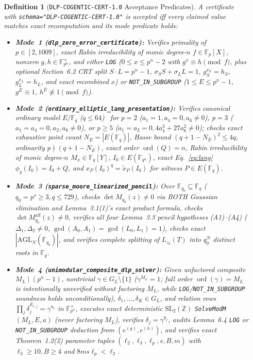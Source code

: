 \documentclass[10pt,twocolumn]{article}
\newtheorem{definition}{Definition}
\newcommand{\FF}{\mathbb{F}}
\newcommand{\ZZ}{\mathbb{Z}}
\begin{document}
\begin{definition}[\nolinkurl{DLP-COGENTIC-CERT-1.0} Acceptance Predicates]\label{def:cert}
\normalfont A certificate with \nolinkurl{schema="DLP-COGENTIC-CERT-1.0"} is accepted iff every claimed value matches exact recomputation and its mode predicate holds:
\begin{itemize}[leftmargin=1.2em,itemsep=1pt,topsep=2pt]
  \item \textbf{Mode~1 (\nolinkurl{dlp_zero_error_certificate}):} Verifies primality of $p\in[2,1009]$, exact Rabin irreducibility of monic degree-$n$ $f\in\FF_p[X]$, nonzero $g,h\in\FF_{p^n}^\times$, and either \texttt{LOG} ($0\le x\le p^n-2$ with $g^x\equiv h\pmod f$, plus optional Section~6.2 CRT split $S\cdot L=p^n-1$, $\sigma_S S+\sigma_L L=1$, $g_S^{x_S}=h_S$, $g_L^{x_L}=h_L$, and exact recombined $x$) or \texttt{NOT\_IN\_SUBGROUP} ($1\le E\le p^n-1$, $g^E\equiv 1$, $h^E\not\equiv 1\pmod f$).
  \item \textbf{Mode~2 (\nolinkurl{ordinary_elliptic_lang_presentation}):} Verifies canonical ordinary model $E/\FF_q$ ($q\le 64$)~\cite{silverman2009arithmetic} for $p=2$ ($a_1=1,a_4=0,a_6\ne 0$), $p=3$ ($a_1=a_4=0,a_2,a_6\ne 0$), or $p\ge 5$ ($a_1=a_2=0, 4a_4^3+27a_6^2\ne 0$); checks exact exhaustive point count $N_E=|E(\FF_q)|$, Hasse bound $(q+1-N_E)^2\le 4q$, ordinarity $p\nmid(q+1-N_E)$, exact order $\operatorname{ord}(Q)=n$, Rabin irreducibility of monic degree-$n$ $M_x\in\FF_q[Y]$, $I_0\in E(\FF_{q^n})$, exact Eq.~\eqref{eq:lang} $\phi_q(I_0)=I_0+Q$, and $x_P(I_0)^q=\tilde{x}_P(I_0)$ for witness $P\in E(\FF_q)$.
  \item \textbf{Mode~3 (\nolinkurl{sparse_moore_linearized_pencil}):} Over $\FF_{q_0}\subseteq\FF_q$ ($q_0=p^s\ge 3, q\le 729$), checks $\det M_{q_0}(z)\ne 0$ via BOTH Gaussian elimination and Lemma~3.1(1)'s exact product formula, checks $\det M^{\mathrm{aff}}_{q_0}(z)\ne 0$, verifies all four Lemma~3.3 pencil hypotheses (A1)--(A4) ($\Delta_1,\Delta_2\ne 0$, $\gcd(A_0,A_1)=\gcd(L_0,L_1)=1$), checks exact $|\mathrm{AGL}_N(\FF_{q_0})|$, and verifies complete splitting of $L_{z_0}(T)$ into $q_0^N$ distinct roots in $\FF_q$.
  \item \textbf{Mode~4 (\nolinkurl{unimodular_composite_dlp_solver}):} Given unfactored composite $M_L\mid(p^n-1)$, nontrivial $\gamma\in G_L\setminus\{1\}$ ($\gamma^{M_L}=1$; full order $\operatorname{ord}(\gamma)=M_L$ is intentionally unverified without factoring $M_L$, while \texttt{LOG}/\texttt{NOT\_IN\_SUBGROUP} soundness holds unconditionally), $\delta_1,\dots,\delta_K\in G_L$, and relation rows $\prod_j\delta_j^{E_{r,j}}=\gamma^{a_r}$ in $\FF_{p^n}^\times$, executes exact deterministic $\mathrm{SL}_2(\ZZ)$ \texttt{SolveModM}$(M_L,E,a)$ (never factoring $M_L$), verifies $\delta_j=\gamma^{y_j}$, audits Lemma~6.4 \texttt{LOG} or \texttt{NOT\_IN\_SUBGROUP} deduction from $(e^{(g)},e^{(h)})$, and verifies exact Theorem~1.2(2) parameter tuples $(\ell_2,\ell_3,\ell_p,s,B,m)$ with $\ell_3\ge 10, B\ge 4$ and $8 m s \ell_p < \ell_2$.
\end{itemize}
\end{definition}
\end{document}
